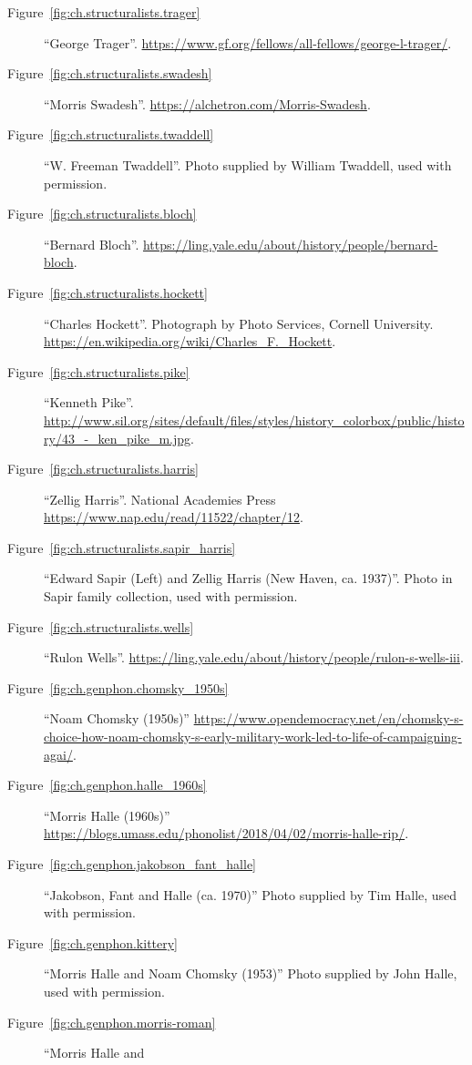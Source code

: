 \begin{description}
\item[Figure~\ref{fig:ch.structuralists.trager}] ``George
  Trager''. \url{https://www.gf.org/fellows/all-fellows/george-l-trager/}.
\item[Figure~\ref{fig:ch.structuralists.swadesh}] ``Morris
  Swadesh''.  \url{https://alchetron.com/Morris-Swadesh}.
\item[Figure~\ref{fig:ch.structuralists.twaddell}] ``W. Freeman
  Twaddell''. Photo supplied by William Twaddell, used with permission.
\item[Figure~\ref{fig:ch.structuralists.bloch}] ``Bernard
  Bloch''. \url{https://ling.yale.edu/about/history/people/bernard-bloch}. 
\item[Figure~\ref{fig:ch.structuralists.hockett}] ``Charles
  Hockett''. Photograph by Photo Services, Cornell University. 
  \url{https://en.wikipedia.org/wiki/Charles_F._Hockett}.
\item[Figure~\ref{fig:ch.structuralists.pike}] ``Kenneth
  Pike''. 
  \url{http://www.sil.org/sites/default/files/styles/history_colorbox/public/history/43_-_ken_pike_m.jpg}.
\item[Figure~\ref{fig:ch.structuralists.harris}] ``Zellig
  Harris''. National Academies Press
  \url{https://www.nap.edu/read/11522/chapter/12}.
\item[Figure~\ref{fig:ch.structuralists.sapir_harris}] ``Edward Sapir (Left)
  and Zellig Harris (New Haven, ca. 1937)''. Photo in Sapir family
  collection, used with permission.
\item[Figure~\ref{fig:ch.structuralists.wells}] ``Rulon Wells''. \url{https://ling.yale.edu/about/history/people/rulon-s-wells-iii}.
\item[Figure~\ref{fig:ch.genphon.chomsky_1950s}] ``Noam Chomsky
  (1950s)''
  \url{https://www.opendemocracy.net/en/chomsky-s-choice-how-noam-chomsky-s-early-military-work-led-to-life-of-campaigning-agai/}.
\item[Figure~\ref{fig:ch.genphon.halle_1960s}] ``Morris Halle
  (1960s)'' \url{https://blogs.umass.edu/phonolist/2018/04/02/morris-halle-rip/}.
\item[Figure~\ref{fig:ch.genphon.jakobson_fant_halle}] ``Jakobson,
  Fant and Halle (ca. 1970)'' Photo supplied by Tim Halle, used with
  permission.
\item[Figure~\ref{fig:ch.genphon.kittery}] ``Morris Halle and Noam
  Chomsky (1953)'' Photo supplied by John Halle, used
  with permission.
\item[Figure~\ref{fig:ch.genphon.morris-roman}] ``Morris Halle and

\end{description}
